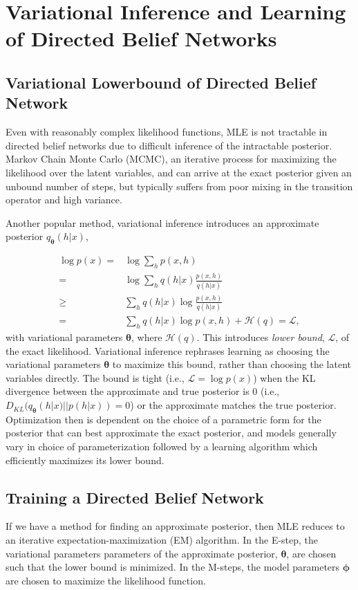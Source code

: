 \documentclass{article} %
\newcommand{\vects}[1]{\boldsymbol{#1}}
\newcommand{\TT}[0]{\vects{\theta}}
\newcommand{\PP}[0]{\vects{\phi}}
\newcommand{\LL}[0]{\mathcal{L}}
\newcommand{\HH}[0]{\mathcal{H}}
\begin{document}
\section{Variational Inference and Learning of Directed Belief Networks}
\subsection{Variational Lowerbound of Directed Belief Network}

Even with reasonably complex likelihood functions, MLE is not tractable in directed belief networks due to difficult inference of the intractable posterior. Markov Chain Monte Carlo (MCMC), an iterative process for maximizing the likelihood over the latent variables, and can arrive at the exact posterior given an unbound number of steps, but typically suffers from poor mixing in the transition operator and high variance. 

Another popular method, variational inference introduces an approximate posterior $q_{\TT}(h|x)$,

\begin{align}
    \label{eq:approx_logp}
    \log p(x) =& \log \sum_{h} p(x, h) \nonumber \\
    =& \log \sum_h q(h|x) \frac{p(x, h)}{q(h|x)} \nonumber \\
    \geq& \sum_h q(h|x) \log \frac{p(x, h)}{q(h|x)} \nonumber \\
    =& \sum_h q(h|x) \log p(x,h) + \HH(q) = \LL,
\end{align}
with variational parameters $\TT$, where $\HH(q)$. This introduces \emph{lower bound}, $\LL$, of the exact likelihood. Variational inference rephrases learning as choosing the variational parameters $\TT$ to maximize this bound, rather than choosing the latent variables directly. The bound is tight (i.e., $\LL = \log p(x)$) when the KL divergence between the approximate and true posterior is $0$ (i.e., $D_{KL}(q_{\TT}(h|x)||p(h|x)) = 0$) or the approximate matches the true posterior. Optimization then is dependent on the choice of a parametric form for the posterior that can best approximate the exact posterior, and models generally vary in choice of parameterization followed by a learning algorithm which efficiently maximizes its lower bound.

\subsection{Training a Directed Belief Network}
If we have a method for finding an approximate posterior, then MLE reduces to an iterative expectation-maximization (EM) algorithm. In the E-step, the variational parameters parameters of the approximate posterior, $\TT$, are chosen such that the lower bound is minimized. In the M-steps, the model parameters $\PP$ are chosen to maximize the likelihood function.
\end{document}
